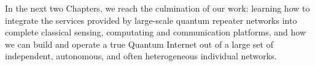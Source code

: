 \begin{partintro}
In the next two Chapters, we reach the culmination of our work: learning how to integrate the services provided by large-scale quantum repeater networks into complete classical sensing, computating and communication platforms, and how we can build and operate a true Quantum Internet out of a large set of independent, autonomous, and often heterogeneous individual networks.
\end{partintro}
